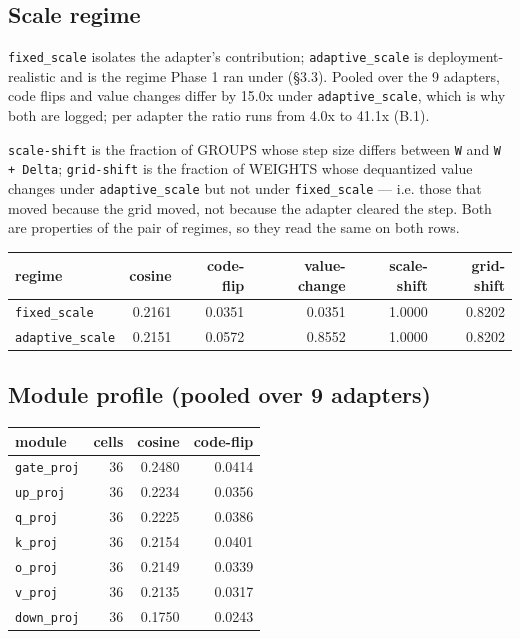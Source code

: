 \subsection{Scale regime}

\texttt{fixed\_\allowbreak{}scale} isolates the adapter's contribution; \texttt{adaptive\_\allowbreak{}scale} is deployment-realistic and is the regime Phase 1 ran under (\S{}3.3). Pooled over the 9 adapters, code flips and value changes differ by 15.0x under \texttt{adaptive\_\allowbreak{}scale}, which is why both are logged; per adapter the ratio runs from 4.0x to 41.1x (B.1).

\texttt{scale-\allowbreak{}shift} is the fraction of GROUPS whose step size differs between \texttt{W} and \texttt{W + Delta}; \texttt{grid-\allowbreak{}shift} is the fraction of WEIGHTS whose dequantized value changes under \texttt{adaptive\_\allowbreak{}scale} but not under \texttt{fixed\_\allowbreak{}scale} --- i.e. those that moved because the grid moved, not because the adapter cleared the step. Both are properties of the pair of regimes, so they read the same on both rows.

\begin{table}[t]
\centering\footnotesize
\begin{tabularx}{\textwidth}{>{\hsize=1.000\hsize\raggedright\arraybackslash}Xrrrrr}
\toprule
regime & cosine & code-flip & value-change & scale-shift & grid-shift \\
\midrule
\texttt{fixed\_\allowbreak{}scale} & 0.2161 & 0.0351 & 0.0351 & 1.0000 & 0.8202 \\
\texttt{adaptive\_\allowbreak{}scale} & 0.2151 & 0.0572 & 0.8552 & 1.0000 & 0.8202 \\
\bottomrule
\end{tabularx}
\end{table}

\subsection{Module profile (pooled over 9 adapters)}

\begin{center}\footnotesize
\begin{tabular}{lrrr}
\toprule
module & cells & cosine & code-flip \\
\midrule
\texttt{gate\_\allowbreak{}proj} & 36 & 0.2480 & 0.0414 \\
\texttt{up\_\allowbreak{}proj} & 36 & 0.2234 & 0.0356 \\
\texttt{q\_\allowbreak{}proj} & 36 & 0.2225 & 0.0386 \\
\texttt{k\_\allowbreak{}proj} & 36 & 0.2154 & 0.0401 \\
\texttt{o\_\allowbreak{}proj} & 36 & 0.2149 & 0.0339 \\
\texttt{v\_\allowbreak{}proj} & 36 & 0.2135 & 0.0317 \\
\texttt{down\_\allowbreak{}proj} & 36 & 0.1750 & 0.0243 \\
\bottomrule
\end{tabular}
\end{center}

